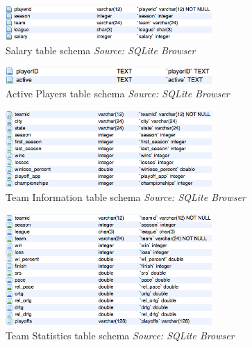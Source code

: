 \begin{figure}[h!]
	\begin{center}
		\includegraphics[width=0.7\textwidth]{./images/salary}
		\caption{Salary table schema \textit{Source: SQLite Browser}}
		\label{fig:411-4}
	\end{center}
\end{figure}

\begin{figure}[h!]
	\begin{center}
		\includegraphics[width=0.7\textwidth]{./images/activeplayers}
		\caption{Active Players table schema \textit{Source: SQLite Browser}}
		\label{fig:411-5}
	\end{center}
\end{figure}

\begin{figure}[h!]
	\begin{center}
		\includegraphics[width=0.7\textwidth]{./images/teaminfo}
		\caption{Team Information table schema \textit{Source: SQLite Browser}}
		\label{fig:411-6}
	\end{center}
\end{figure}

\begin{figure}[h!]
	\begin{center}
		\includegraphics[width=0.7\textwidth]{./images/teamstats}
		\caption{Team Statistics table schema \textit{Source: SQLite Browser}}
		\label{fig:411-7}
	\end{center}
\end{figure}